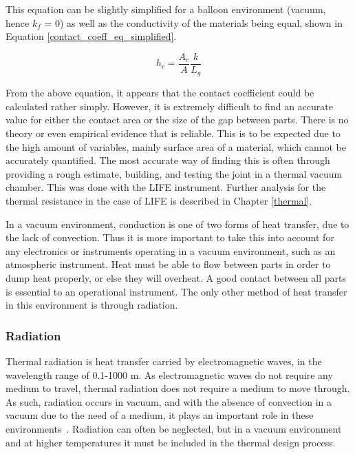 This equation can be slightly simplified for a balloon environment (vacuum, hence $k_f$ = 0) as well as the conductivity of the materials being equal, shown in Equation \ref{contact_coeff_eq_simplified}.

\begin{equation}\label{contact_coeff_eq_simplified}
    h_c = \frac{A_c}{A}\frac{k}{L_g}
\end{equation}

From the above equation, it appears that the contact coefficient could be calculated rather simply. However, it is extremely difficult to find an accurate value for either the contact area or the size of the gap between parts. There is no theory or even empirical evidence that is reliable. This is to be expected due to the high amount of variables, mainly surface area of a material, which cannot be accurately quantified. The most accurate way of finding this is often through providing a rough estimate, building, and testing the joint in a thermal vacuum chamber. This was done with the LIFE instrument. Further analysis for the thermal resistance in the case of LIFE is described in Chapter \ref{thermal}.

In a vacuum environment, conduction is one of two forms of heat transfer, due to the lack of convection. Thus it is more important to take this into account for any electronics or instruments operating in a vacuum environment, such as an atmospheric instrument. Heat must be able to flow between parts in order to dump heat properly, or else they will overheat. A good contact between all parts is essential to an operational instrument. The only other method of heat transfer in this environment is through radiation. 

\subsubsection{Radiation}
Thermal radiation is heat transfer carried by electromagnetic waves, in the wavelength range of 0.1-1000 \textmu m. As electromagnetic waves do not require any medium to travel, thermal radiation does not require a medium to move through. As such, radiation occurs in vacuum, and with the absence of convection in a vacuum due to the need of a medium, it plays an important role in these environments~\citep{Heat_Transfer_Basics}. Radiation can often be neglected, but in a vacuum environment and at higher temperatures it must be included in the thermal design process.

